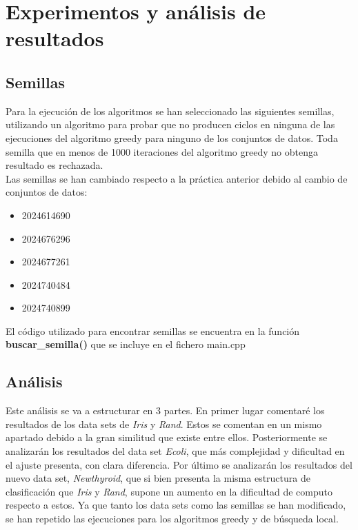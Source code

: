 \chapter{Experimentos y análisis de resultados}
\section{Semillas}
Para la ejecución de los algoritmos se han seleccionado las siguientes semillas, utilizando un algoritmo para probar que no producen ciclos en ninguna de las ejecuciones del algoritmo greedy para ninguno de los conjuntos de datos. Toda semilla que en menos de 1000 iteraciones del algoritmo greedy no obtenga resultado es rechazada. \\
Las semillas se han cambiado respecto a la práctica anterior debido al cambio de conjuntos de datos:
\begin{itemize}
   \item 2024614690
   \item 2024676296
   \item 2024677261
   \item 2024740484
   \item 2024740899
\end{itemize}


El código utilizado para encontrar semillas se encuentra en la función \textbf{buscar\_semilla()} que se incluye en el fichero main.cpp


\section{Análisis}
Este análisis se va a estructurar en 3 partes. En primer lugar comentaré los resultados de los data sets de \emph{Iris} y \emph{Rand}. Estos se comentan en un mismo apartado debido a la gran similitud que existe entre ellos. Posteriormente se analizarán los resultados del data set \emph{Ecoli}, que más complejidad y dificultad en el ajuste presenta, con clara diferencia. Por último se analizarán los resultados del nuevo data set, \emph{Newthyroid}, que si bien presenta la misma estructura de clasificación que \emph{Iris} y \emph{Rand}, supone un aumento en la dificultad de computo respecto a estos. Ya que tanto los data sets como las semillas se han modificado, se han repetido las ejecuciones para los algoritmos greedy y de búsqueda local.

